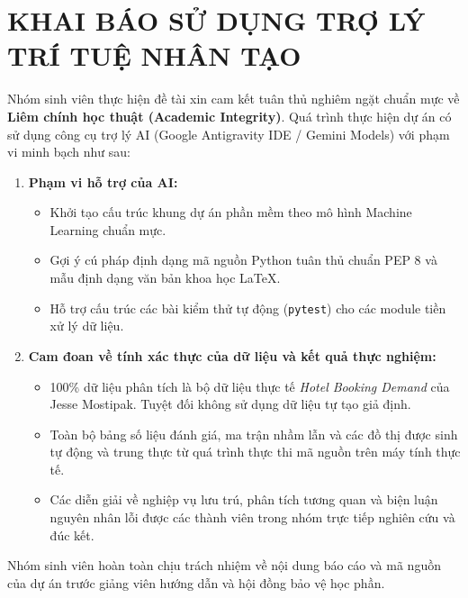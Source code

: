 \chapter*{KHAI BÁO SỬ DỤNG TRỢ LÝ TRÍ TUỆ NHÂN TẠO}

Nhóm sinh viên thực hiện đề tài xin cam kết tuân thủ nghiêm ngặt chuẩn mực về \textbf{Liêm chính học thuật (Academic Integrity)}. Quá trình thực hiện dự án có sử dụng công cụ trợ lý AI (Google Antigravity IDE / Gemini Models) với phạm vi minh bạch như sau:

\begin{enumerate}
    \item \textbf{Phạm vi hỗ trợ của AI:}
    \begin{itemize}
        \item Khởi tạo cấu trúc khung dự án phần mềm theo mô hình Machine Learning chuẩn mực.
        \item Gợi ý cú pháp định dạng mã nguồn Python tuân thủ chuẩn PEP 8 và mẫu định dạng văn bản khoa học LaTeX.
        \item Hỗ trợ cấu trúc các bài kiểm thử tự động (\texttt{pytest}) cho các module tiền xử lý dữ liệu.
    \end{itemize}
    \item \textbf{Cam đoan về tính xác thực của dữ liệu và kết quả thực nghiệm:}
    \begin{itemize}
        \item 100\% dữ liệu phân tích là bộ dữ liệu thực tế \textit{Hotel Booking Demand} của Jesse Mostipak. Tuyệt đối không sử dụng dữ liệu tự tạo giả định.
        \item Toàn bộ bảng số liệu đánh giá, ma trận nhầm lẫn và các đồ thị được sinh tự động và trung thực từ quá trình thực thi mã nguồn trên máy tính thực tế.
        \item Các diễn giải về nghiệp vụ lưu trú, phân tích tương quan và biện luận nguyên nhân lỗi được các thành viên trong nhóm trực tiếp nghiên cứu và đúc kết.
    \end{itemize}
\end{enumerate}

Nhóm sinh viên hoàn toàn chịu trách nhiệm về nội dung báo cáo và mã nguồn của dự án trước giảng viên hướng dẫn và hội đồng bảo vệ học phần.
